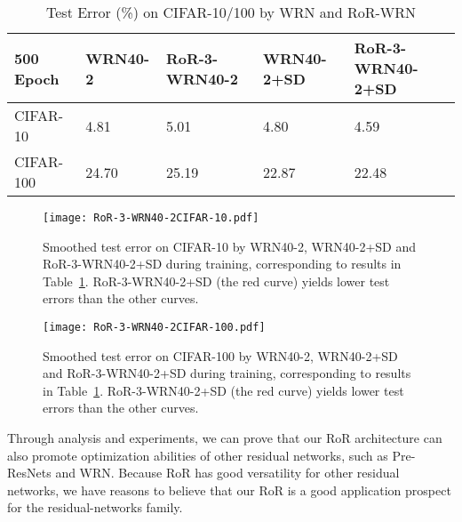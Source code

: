\documentclass[journal]{IEEEtran}
\begin{document}
\begin{table}[!t]
\renewcommand{\arraystretch}{1.3}
\caption{Test Error (\%) on CIFAR-10/100 by WRN and RoR-WRN}
\label{tab:RoR-WRN}
\centering
\begin{tabular}{|p{1.5cm}|p{1.3cm}|p{1.3cm}|p{1.3cm}|p{1.3cm}|}
\hline
500 Epoch           &WRN40-2             &RoR-3-WRN40-2       &WRN40-2+SD  &RoR-3-WRN40-2+SD  \\ \hline\hline
CIFAR-10            &4.81                &5.01                &4.80        &4.59    \\\hline
CIFAR-100           &24.70               &25.19               &22.87       &22.48    \\\hline
\end{tabular}
\end{table}
\begin{figure}
\centering
\texttt{[image: RoR-3-WRN40-2CIFAR-10.pdf]}
\caption{Smoothed test error on CIFAR-10 by WRN40-2, WRN40-2+SD and RoR-3-WRN40-2+SD during training, corresponding to results in Table~\ref{tab:RoR-WRN}. RoR-3-WRN40-2+SD (the red curve) yields lower test errors than the other curves.}
\label{fig:WRN10}
\end{figure} 
\begin{figure}
\centering
\texttt{[image: RoR-3-WRN40-2CIFAR-100.pdf]}
\caption{Smoothed test error on CIFAR-100 by WRN40-2, WRN40-2+SD and RoR-3-WRN40-2+SD during training, corresponding to results in Table~\ref{tab:RoR-WRN}. RoR-3-WRN40-2+SD (the red curve) yields lower test errors than the other curves.}
\label{fig:WRN100}
\end{figure} 
\par 
Through analysis and experiments, we can prove that our RoR architecture can also promote optimization abilities of other residual networks, such as Pre-ResNets and WRN. Because RoR has good versatility for other residual networks, we have reasons to believe that our RoR is a good application prospect for the residual-networks family.
\end{document}
